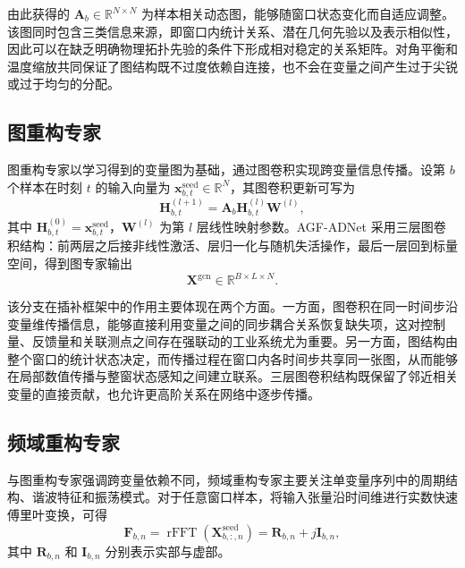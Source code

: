 \documentclass[bachelor, vlined]{DissertUESTC}
\begin{document}
    由此获得的 $\mathbf{A}_b \in \mathbb{R}^{N \times N}$ 为样本相关动态图，能够随窗口状态变化而自适应调整。该图同时包含三类信息来源，即窗口内统计关系、潜在几何先验以及表示相似性，因此可以在缺乏明确物理拓扑先验的条件下形成相对稳定的关系矩阵。对角平衡和温度缩放共同保证了图结构既不过度依赖自连接，也不会在变量之间产生过于尖锐或过于均匀的分配。

    \subsection{图重构专家}
    
    图重构专家以学习得到的变量图为基础，通过图卷积实现跨变量信息传播。设第 $b$ 个样本在时刻 $t$ 的输入向量为 $\mathbf{x}_{b,t}^{\mathrm{seed}} \in \mathbb{R}^{N}$，其图卷积更新可写为
    \begin{equation}
        \mathbf{H}_{b,t}^{(l+1)} = \mathbf{A}_b \mathbf{H}_{b,t}^{(l)} \mathbf{W}^{(l)},
    \end{equation}
    其中 $\mathbf{H}_{b,t}^{(0)} = \mathbf{x}_{b,t}^{\mathrm{seed}}$，$\mathbf{W}^{(l)}$ 为第 $l$ 层线性映射参数。AGF-ADNet 采用三层图卷积结构：前两层之后接非线性激活、层归一化与随机失活操作，最后一层回到标量空间，得到图专家输出
    \begin{equation}
        \mathbf{X}^{\mathrm{gcn}} \in \mathbb{R}^{B \times L \times N}.
    \end{equation}
    
    该分支在插补框架中的作用主要体现在两个方面。一方面，图卷积在同一时间步沿变量维传播信息，能够直接利用变量之间的同步耦合关系恢复缺失项，这对控制量、反馈量和关联测点之间存在强联动的工业系统尤为重要。另一方面，图结构由整个窗口的统计状态决定，而传播过程在窗口内各时间步共享同一张图，从而能够在局部数值传播与整窗状态感知之间建立联系。三层图卷积结构既保留了邻近相关变量的直接贡献，也允许更高阶关系在网络中逐步传播。
    
    \subsection{频域重构专家}
    
    与图重构专家强调跨变量依赖不同，频域重构专家主要关注单变量序列中的周期结构、谐波特征和振荡模式。对于任意窗口样本，将输入张量沿时间维进行实数快速傅里叶变换，可得
    \begin{equation}
        \mathbf{F}_{b,n} = \operatorname{rFFT}\!\left(\mathbf{X}_{b,:,n}^{\mathrm{seed}}\right)
        = \mathbf{R}_{b,n} + j \mathbf{I}_{b,n},
    \end{equation}
    其中 $\mathbf{R}_{b,n}$ 和 $\mathbf{I}_{b,n}$ 分别表示实部与虚部。
    
\end{document}
